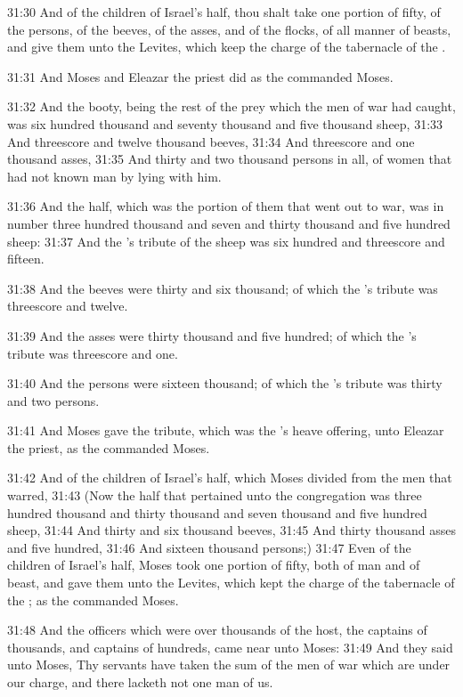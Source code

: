 31:30 And of the children of Israel's half, thou shalt take one portion of fifty, of the persons, of the beeves, of the asses, and of the flocks, of all manner of beasts, and give them unto the Levites, which keep the charge of the tabernacle of the \LORD.

31:31 And Moses and Eleazar the priest did as the \LORD commanded Moses.

31:32 And the booty, being the rest of the prey which the men of war had caught, was six hundred thousand and seventy thousand and five thousand sheep, 31:33 And threescore and twelve thousand beeves, 31:34 And threescore and one thousand asses, 31:35 And thirty and two thousand persons in all, of women that had not known man by lying with him.

31:36 And the half, which was the portion of them that went out to war, was in number three hundred thousand and seven and thirty thousand and five hundred sheep: 31:37 And the \LORD's tribute of the sheep was six hundred and threescore and fifteen.

31:38 And the beeves were thirty and six thousand; of which the \LORD's tribute was threescore and twelve.

31:39 And the asses were thirty thousand and five hundred; of which the \LORD's tribute was threescore and one.

31:40 And the persons were sixteen thousand; of which the \LORD's tribute was thirty and two persons.

31:41 And Moses gave the tribute, which was the \LORD's heave offering, unto Eleazar the priest, as the \LORD commanded Moses.

31:42 And of the children of Israel's half, which Moses divided from the men that warred, 31:43 (Now the half that pertained unto the congregation was three hundred thousand and thirty thousand and seven thousand and five hundred sheep, 31:44 And thirty and six thousand beeves, 31:45 And thirty thousand asses and five hundred, 31:46 And sixteen thousand persons;) 31:47 Even of the children of Israel's half, Moses took one portion of fifty, both of man and of beast, and gave them unto the Levites, which kept the charge of the tabernacle of the \LORD; as the \LORD commanded Moses.

31:48 And the officers which were over thousands of the host, the captains of thousands, and captains of hundreds, came near unto Moses: 31:49 And they said unto Moses, Thy servants have taken the sum of the men of war which are under our charge, and there lacketh not one man of us.

